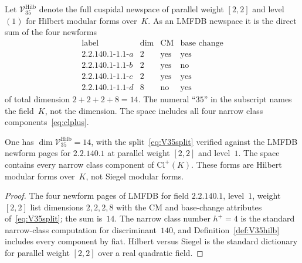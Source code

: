 \begin{definition}\label{def:V35hilb}
Let $\mathcal V_{35}^{\mathrm{Hilb}}$ denote the full cuspidal newspace of parallel weight $[2,2]$ and level~$(1)$ for Hilbert modular forms over~$K$. As an LMFDB newspace it is the direct sum of the four newforms
\begin{equation}\label{eq:V35split}
\begin{array}{c|ccc}
\text{label} & \dim & \mathrm{CM} & \text{base change}\\\hline
2.2.140.1\text{-}1.1\text{-}a & 2 & \mathrm{yes} & \mathrm{yes}\\
2.2.140.1\text{-}1.1\text{-}b & 2 & \mathrm{yes} & \mathrm{no}\\
2.2.140.1\text{-}1.1\text{-}c & 2 & \mathrm{yes} & \mathrm{yes}\\
2.2.140.1\text{-}1.1\text{-}d & 8 & \mathrm{no} & \mathrm{yes}
\end{array}
\end{equation}
of total dimension $2+2+2+8=14$. The numeral ``$35$'' in the subscript names the field~$K$, not the dimension. The space includes all four narrow class components~\eqref{eq:clplus}.
\end{definition}

\begin{theorem}\label{thm:V35}
One has $\dim\mathcal V_{35}^{\mathrm{Hilb}}=14$, with the split~\eqref{eq:V35split} verified against the LMFDB newform pages for $2.2.140.1$ at parallel weight $[2,2]$ and level~$1$. The space contains every narrow class component of $\mathrm{Cl}^+(K)$. These forms are Hilbert modular forms over~$K$, not Siegel modular forms.
\end{theorem}
\begin{proof}
The four newform pages of LMFDB for field $2.2.140.1$, level~$1$, weight~$[2,2]$ list dimensions $2,2,2,8$ with the CM and base-change attributes of~\eqref{eq:V35split}; the sum is~$14$. The narrow class number $h^+=4$ is the standard narrow-class computation for discriminant~$140$, and Definition~\ref{def:V35hilb} includes every component by fiat. Hilbert versus Siegel is the standard dictionary for parallel weight $[2,2]$ over a real quadratic field.
\end{proof}

